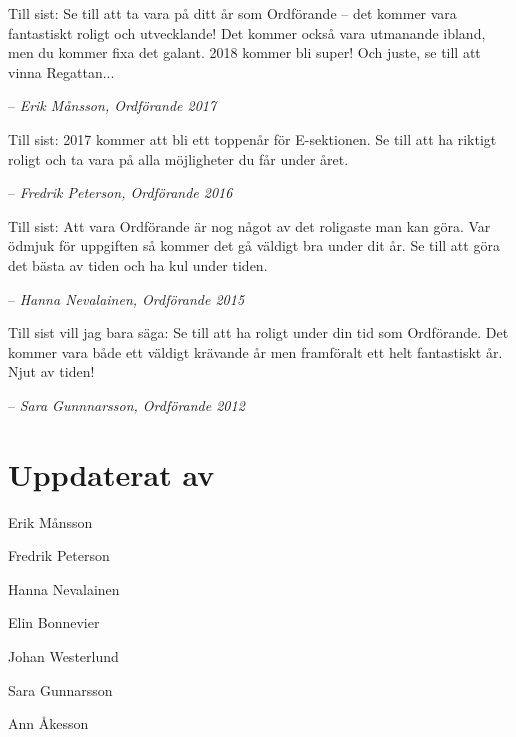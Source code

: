 \documentclass[10pt]{article}
\begin{document}
Till sist: Se till att ta vara på ditt år som Ordförande -- det kommer vara fantastiskt roligt och utvecklande! Det kommer också vara utmanande ibland, men du kommer fixa det galant. 2018 kommer bli super! Och juste, se till att vinna Regattan...

-- \emph{Erik Månsson, Ordförande 2017}

\vspace*{1ex}

Till sist: 2017 kommer att bli ett toppenår för E-sektionen. Se till att ha riktigt roligt och ta vara på alla möjligheter du får under året.

-- \emph{Fredrik Peterson, Ordförande 2016}

\vspace*{1ex}

Till sist: Att vara Ordförande är nog något av det roligaste man kan göra. Var ödmjuk för uppgiften så kommer det gå väldigt bra under dit år. Se till att göra det bästa av tiden och ha kul under tiden.

-- \emph{Hanna Nevalainen, Ordförande 2015}

\vspace*{1ex}

Till sist vill jag bara säga: Se till att ha roligt under din tid som Ordförande. Det kommer vara både ett väldigt krävande år men framföralt ett helt fantastiskt år. Njut av tiden!

-- \emph{Sara Gunnnarsson, Ordförande 2012}

\newpage

\section{Uppdaterat av}

\begin{description}[noitemsep, itemsep=1mm]
    \item[2017] Erik Månsson
    \item[2016] Fredrik Peterson
    \item[2015] Hanna Nevalainen
    \item[2014] Elin Bonnevier
    \item[2013] Johan Westerlund
    \item[2012] Sara Gunnarsson
    \item[2005] Ann Åkesson
\end{description}
\end{document}
